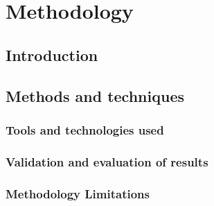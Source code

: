 \chapter{Methodology}
\label{ch:methodology}

\section{Introduction}
\section{Methods and techniques}
    \subsection{Tools and technologies used}
    \subsection{Validation and evaluation of results}
    \subsection{Methodology Limitations}
